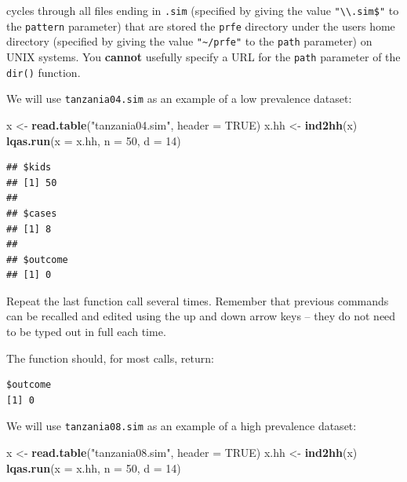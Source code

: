 \documentclass[12pt,a4paper]{book}
\newenvironment{Shaded}{\begin{snugshade}}{\end{snugshade}}
\newcommand{\KeywordTok}[1]{\textcolor[rgb]{0.13,0.29,0.53}{\textbf{#1}}}
\newcommand{\DataTypeTok}[1]{\textcolor[rgb]{0.13,0.29,0.53}{#1}}
\newcommand{\DecValTok}[1]{\textcolor[rgb]{0.00,0.00,0.81}{#1}}
\newcommand{\StringTok}[1]{\textcolor[rgb]{0.31,0.60,0.02}{#1}}
\newcommand{\OtherTok}[1]{\textcolor[rgb]{0.56,0.35,0.01}{#1}}
\newcommand{\NormalTok}[1]{#1}
\theoremstyle{definition}
\theoremstyle{definition}
\theoremstyle{definition}
\theoremstyle{remark}
\begin{document}
cycles through all files ending in \texttt{.sim} (specified by giving
the value \texttt{"\textbackslash{}\textbackslash{}.sim\$"} to the
\texttt{pattern} parameter) that are stored the \texttt{prfe} directory
under the users home directory (specified by giving the value
\texttt{"\textasciitilde{}/prfe"} to the \texttt{path} parameter) on
UNIX systems. You \textbf{cannot} usefully specify a URL for the
\texttt{path} parameter of the \texttt{dir()} function.

We will use \texttt{tanzania04.sim} as an example of a low prevalence
dataset:

\begin{Shaded}
\begin{Highlighting}[]
\NormalTok{x <-}\StringTok{ }\KeywordTok{read.table}\NormalTok{(}\StringTok{"tanzania04.sim"}\NormalTok{, }\DataTypeTok{header =} \OtherTok{TRUE}\NormalTok{)}
\NormalTok{x.hh <-}\StringTok{ }\KeywordTok{ind2hh}\NormalTok{(x)}
\KeywordTok{lqas.run}\NormalTok{(}\DataTypeTok{x =}\NormalTok{ x.hh, }\DataTypeTok{n =} \DecValTok{50}\NormalTok{, }\DataTypeTok{d =} \DecValTok{14}\NormalTok{)}
\end{Highlighting}
\end{Shaded}

\begin{verbatim}
## $kids
## [1] 50
## 
## $cases
## [1] 8
## 
## $outcome
## [1] 0
\end{verbatim}

Repeat the last function call several times. Remember that previous
commands can be recalled and edited using the up and down arrow keys --
they do not need to be typed out in full each time.

The function should, for most calls, return:

\begin{verbatim}
$outcome
[1] 0
\end{verbatim}

We will use \texttt{tanzania08.sim} as an example of a high prevalence
dataset:

\begin{Shaded}
\begin{Highlighting}[]
\NormalTok{x <-}\StringTok{ }\KeywordTok{read.table}\NormalTok{(}\StringTok{"tanzania08.sim"}\NormalTok{, }\DataTypeTok{header =} \OtherTok{TRUE}\NormalTok{)}
\NormalTok{x.hh <-}\StringTok{ }\KeywordTok{ind2hh}\NormalTok{(x)}
\KeywordTok{lqas.run}\NormalTok{(}\DataTypeTok{x =}\NormalTok{ x.hh, }\DataTypeTok{n =} \DecValTok{50}\NormalTok{, }\DataTypeTok{d =} \DecValTok{14}\NormalTok{)}
\end{Highlighting}
\end{Shaded}
\end{document}
